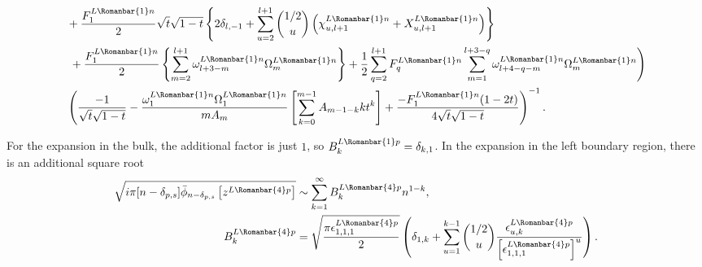 \documentclass[11pt]{article}
\newcommand*{\Chi}{X}
\newcommand{\lln}{L{\tiny\Rleft} n}
\newcommand{\ql}{L}
\newcommand{\rb}{{\scriptsize \Romanbar{1}} }
\newcommand{\rl}{{\scriptsize \Romanbar{4}} }
\newcommand{\pg}{p}
\newcommand{\pn}{n}
\newcommand{\ps}{s}
\numberwithin{equation}{section}
\newcommand{\Rleft}{\Romanbar{4}}
\begin{document}
\begin{align}
	& +\frac{F_1^{\ql\rb\pn}}{2} \sqrt{t}\sqrt{1-t} \left\{ 2\delta_{l,-1} + \sum_{u=2}^{l+1} {1/2 \choose u} \left( \chi_{u,l+1}^{\ql\rb\pn} + \Chi_{u,l+1}^{\ql\rb\pn}\right) \right\} \\ %
	& \left. \vphantom{\frac{\cos\left(\frac{\pi}{2} +\frac{\pi}{2}j\right) }{j!}} + \frac{F_1^{\ql\rb\pn}}{2}\left\{ \sum_{m=2}^{l+1} \omega_{l+3-m}^{\ql\rb\pn} \Omega_m^{\ql\rb\pn} \right\}  + \frac{1}{2} \sum_{q=2}^{l+1} F_q^{\ql\rb\pn} \sum_{m=1}^{l+3-q} \omega_{l+4-q-m}^{\ql\rb\pn} \Omega_m^{\ql\rb\pn} \right) \\
	& \left( \frac{-1 }{\sqrt{t}\sqrt{1-t } }  - \frac{\omega_1^{\ql\rb\pn}\Omega_1^{\ql\rb\pn}}{mA_m}\left[\sum_{k=0}^{m-1} A_{m-1-k} k t^k \right]  + \frac{-F_1^{\ql\rb\pn} (1-2 t) }{4\sqrt{t}\sqrt{1-t } } \right)^{-1}. %
\end{align}



For the expansion in the bulk, the additional factor is just $1$, so $B_k^{\ql\rb\pg} = \delta_{k,1}$. In the expansion in the left boundary region, there is an additional square root 
\begin{align}
	\sqrt{i\pi[n-\delta_{\pg,\ps}]\bar{\phi}_{n-\delta_{\pg,\ps}}\left[z^{\ql\rl\pg}\right]} & \sim \sum_{k=1}^\infty B_k^{\ql\rl\pg} n^{1-k}, \\
	B_k^{\ql\rl\pg} & = \sqrt{ \frac{\pi\epsilon_{1,1,1}^{\ql\rl\pg}}{2}} \left( \delta_{1,k} + \sum_{u=1}^{k-1} {1/2 \choose u} \frac{ \epsilon_{u,k}^{\ql\rl\pg} }{ \left[\epsilon_{1,1,1}^{\ql\rl\pg}\right]^u } \right).%
\end{align}
\end{document}
